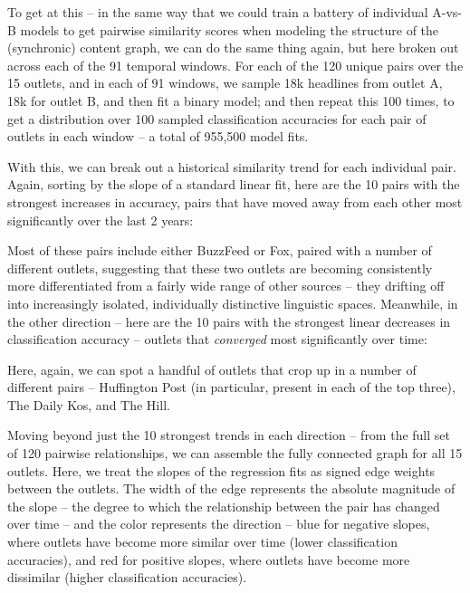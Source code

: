 \documentclass{scrartcl}
\begin{document}
To get at this -- in the same way that we could train a battery of individual A-vs-B models to get pairwise similarity scores when modeling the structure of the (synchronic) content graph, we can do the same thing again, but here broken out across each of the 91 temporal windows. For each of the 120 unique pairs over the 15 outlets, and in each of 91 windows, we sample 18k headlines from outlet A, 18k for outlet B, and then fit a binary model; and then repeat this 100 times, to get a distribution over 100 sampled classification accuracies for each pair of outlets in each window -- a total of 955,500 model fits.

With this, we can break out a historical similarity trend for each individual pair. Again, sorting by the slope of a standard linear fit, here are the 10 pairs with the strongest increases in accuracy, pairs that have moved away from each other most significantly over the last 2 years:


Most of these pairs include either BuzzFeed or Fox, paired with a number of different outlets, suggesting that these two outlets are becoming consistently more differentiated from a fairly wide range of other sources -- they drifting off into increasingly isolated, individually distinctive linguistic spaces. Meanwhile, in the other direction -- here are the 10 pairs with the strongest linear decreases in classification accuracy -- outlets that \textit{converged} most significantly over time:


Here, again, we can spot a handful of outlets that crop up in a number of different pairs -- Huffington Post (in particular, present in each of the top three), The Daily Kos, and The Hill.

Moving beyond just the 10 strongest trends in each direction -- from the full set of 120 pairwise relationships, we can assemble the fully connected graph for all 15 outlets. Here, we treat the slopes of the regression fits as signed edge weights between the outlets. The width of the edge represents the absolute magnitude of the slope -- the degree to which the relationship between the pair has changed over time -- and the color represents the direction -- blue for negative slopes, where outlets have become more similar over time (lower classification accuracies), and red for positive slopes, where outlets have become more dissimilar (higher classification accuracies).
\end{document}
